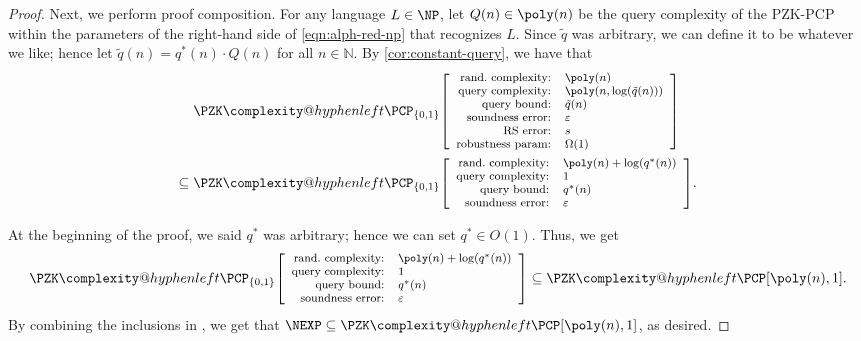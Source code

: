 \documentclass[english,12pt]{reedthesis}
\makeatletter
\theoremstyle{plain}
\theoremstyle{definition}
\theoremstyle{remark}
\newcommand{\pzkpcp}[4]{%
  \ensuremath%
  \mleft[{\footnotesize\begin{array}{r l}
    \text{rand.\ complexity:} & #1 \\
    \text{query complexity:} & #2 \\
    \text{query bound:} & #3 \\
    \text{soundness error:} & #4
  \end{array}}\mright]%
}
\newcommand{\pzkpcpr}[6]{%
  \ensuremath%
  \mleft[{\footnotesize\begin{array}{r l}
    \text{rand.\ complexity:} & #1 \\
    \text{query complexity:} & #2 \\
    \text{query bound:} & #3 \\
    \text{soundness error:} & #4 \\
    \text{RS error:} & #5 \\
    \text{robustness param:} & #6
  \end{array}}\mright]%
}
\newcommand{\PZKPCP}{%
  \PZK\complexity@hyphenleft\PCP
}
\makeatother
\begin{document}
\begin{proof}
  Next, we perform proof composition. For any language $L \in \NP$, let
  $Q(n) \in \poly(n)$ be the query complexity of the PZK-PCP within the parameters
  of the right-hand side of \cref{eqn:alph-red-np} that recognizes $L$. Since
  $\tilde{q}$ was arbitrary, we can define it to be whatever we like; hence let
  $\tilde{q}(n) = q^{*}(n) \cdot Q(n)$ for all $n \in \mathbb{N}$. By
  \cref{cor:constant-query}, we have that
  \begin{equation}\label{eqn:proof-comb-nexp}
    \begin{aligned}
      \PZKPCP_{\{0,1\}}&\pzkpcpr{\poly(n)}{\poly(n, \log(\tilde{q}(n)))}{\tilde{q}(n)}{\varepsilon}{s}{\Omega(1)} \\
      \subseteq \PZKPCP_{\{0,1\}}&\pzkpcp{\poly(n) + \log(q^{*}(n))}{1}{q^{*}(n)}{\varepsilon}.
    \end{aligned}
  \end{equation}

  At the beginning of the proof, we said $q^{*}$ was arbitrary; hence we can set
  $q^{*} \in O(1)$. Thus, we get
  \begin{equation}\label{eqn:qstar-arbitrary-nexp}
      \PZKPCP_{\{0,1\}}\pzkpcp{\poly(n)+\log(q^{*}(n))}{1}{q^{*}(n)}{\varepsilon} \subseteq \PZKPCP[\poly(n), 1].
  \end{equation}
  By combining the inclusions in
  , we get that
  $\NEXP \subseteq \PZKPCP[\poly(n), 1]$, as desired.
\end{proof}
\end{document}
